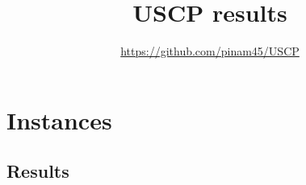 \documentclass[12pt,a4paper,twoside]{article}
\title{USCP results}
\author{\url{https://github.com/pinam45/USCP}}
\date{\DTMusedate{generated} \DTMusetime{generated}}
\begin{document}
	\maketitle{}
	\tableofcontents{}
	\listoftables{}
	\newpage\section{Instances}
		
		
		
		
	\begin{landscape}
		\newpage\section{Results}
			
	\end{landscape}
\end{document}
